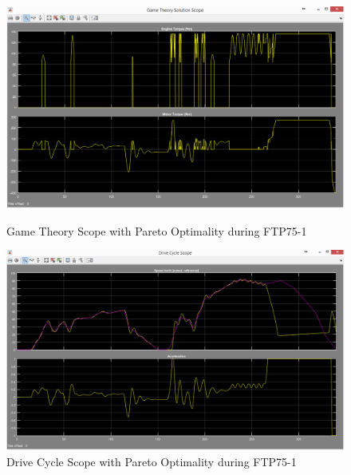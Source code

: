 \begin{figure}[hp]
\centering
\includegraphics[scale=0.45]{figures/Pareto/FTP75-1/gameTheory30Juni}
\caption{Game Theory Scope with Pareto Optimality during FTP75-1}
\label{fig:gtpo1}
\includegraphics[scale=0.41]{figures/Pareto/FTP75-1/driveCycle30Juni}
\caption{Drive Cycle Scope with Pareto Optimality during FTP75-1}
\label{fig:dcpo1}
\end{figure}


